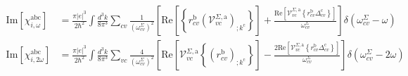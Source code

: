 \documentclass{article}
\begin{document}
\begin{equation*}\label{eq:chis}
\begin{split}
\mathrm{Im}[\chi^{\mathrm{a}\mathrm{b}\mathrm{c}}_{i,\omega}]&= 
\frac{\pi\vert e\vert^3}{2\hbar^2}
\int \frac{d^{3}k}{8\pi^3}
\sum_{cv}\frac{1}{(\omega^\Sigma_{cv})^{2}}
\left[
\mathrm{Re}\left[\left\{r^{\mathrm{b}}_{cv}
\left(\mathcal{V}^{\Sigma,\mathrm{a}}_{vc}\right)_{;k^{\mathrm{c}}}\right\}
\right]
+\frac{\mathrm{Re}\left[\mathcal{V}^{\Sigma,\mathrm{a}}_{vc}
\left\{r^{\mathrm{b}}_{cv}\Delta^{\mathrm{c}}_{cv}\right\}
\right]}{\omega^\Sigma_{cv}} 
\right]\delta(\omega^\Sigma_{cv}-\omega)\\
\mathrm{Im}[\chi^{\mathrm{a}\mathrm{b}\mathrm{c}}_{i,2\omega}]&= 
 \frac{\pi \vert
   e\vert^{3}}{2\hbar^2}
\int \frac{d^{3}k}{8\pi^3}
\sum_{vc}\frac{4}{(\omega^\Sigma_{cv})^{2}}
\left[\mathrm{Re}\left[\mathcal{V}^{\Sigma,\mathrm{a}}_{vc}
\left\{\left(r^{\mathrm{b}}_{cv}\right)_{;k^{\mathrm{c}}}
\right\}\right] -
\frac{2\mathrm{Re}\left[\mathcal{V}^{\Sigma,\mathrm{a}}_{vc}
\left\{r^{\mathrm{b}}_{cv}\Delta^{\mathrm{c}}_{cv}\right\}\right]}
{\omega^\Sigma_{cv}}\right]\delta(\omega^\Sigma_{cv}-2\omega)
\end{split}
\end{equation*}
\end{document}
